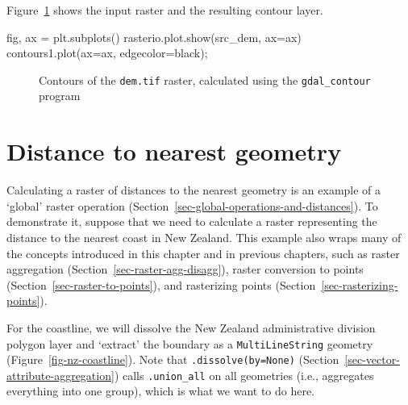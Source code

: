 \documentclass[
  letterpaper,
]{krantz}
\newenvironment{Shaded}{\begin{snugshade}}{\end{snugshade}}
\newcommand{\NormalTok}[1]{\textcolor[rgb]{0.00,0.23,0.31}{#1}}
\newcommand{\OperatorTok}[1]{\textcolor[rgb]{0.37,0.37,0.37}{#1}}
\newcommand{\StringTok}[1]{\textcolor[rgb]{0.13,0.47,0.30}{#1}}
\begin{document}
Figure~\ref{fig-raster-contours2} shows the input raster and the
resulting contour layer.

\begin{Shaded}
\begin{Highlighting}[]
\NormalTok{fig, ax }\OperatorTok{=}\NormalTok{ plt.subplots()}
\NormalTok{rasterio.plot.show(src\_dem, ax}\OperatorTok{=}\NormalTok{ax)}
\NormalTok{contours1.plot(ax}\OperatorTok{=}\NormalTok{ax, edgecolor}\OperatorTok{=}\StringTok{\textquotesingle{}black\textquotesingle{}}\NormalTok{)}\OperatorTok{;}
\end{Highlighting}
\end{Shaded}

\begin{figure}[H]


\caption{\label{fig-raster-contours2}Contours of the \texttt{dem.tif}
raster, calculated using the \texttt{gdal\_contour} program}

\end{figure}%

\section{Distance to nearest
geometry}\label{sec-distance-to-nearest-geometry}

Calculating a raster of distances to the nearest geometry is an example
of a `global' raster operation
(Section~\ref{sec-global-operations-and-distances}). To demonstrate it,
suppose that we need to calculate a raster representing the distance to
the nearest coast in New Zealand. This example also wraps many of the
concepts introduced in this chapter and in previous chapters, such as
raster aggregation (Section~\ref{sec-raster-agg-disagg}), raster
conversion to points (Section~\ref{sec-raster-to-points}), and
rasterizing points (Section~\ref{sec-rasterizing-points}).

For the coastline, we will dissolve the New Zealand administrative
division polygon layer and `extract' the boundary as a
\texttt{\textquotesingle{}MultiLineString\textquotesingle{}} geometry
(Figure~\ref{fig-nz-coastline}). Note that \texttt{.dissolve(by=None)}
(Section~\ref{sec-vector-attribute-aggregation}) calls
\texttt{.union\_all} on all geometries (i.e., aggregates everything into
one group), which is what we want to do here.
\end{document}
